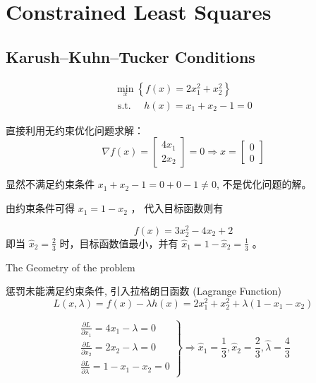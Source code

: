 \chapter{Constrained Least Squares}

\section{Karush–Kuhn–Tucker Conditions}

\begin{problem}
    $$
\begin{array}{l}
\min _{x}\left\{f(x)=2 x_{1}^{2}+x_{2}^{2}\right\} \\
\text { s.t. } \quad h(x)=x_{1}+x_{2}-1=0
\end{array}
$$

直接利用无约束优化问题求解： 
$$ \nabla f(x)=\left[\begin{array}{l}4 x_{1} \\ 2 x_{2}\end{array}\right]=0 \Rightarrow x=\left[\begin{array}{l}0 \\ 0\end{array}\right] $$

显然不满足约束条件 $ x_{1}+x_{2}-1=0+0-1 \neq 0 $, 不是优化问题的解。
\end{problem}

由约束条件可得 $ x_{1}=1-x_{2} $ ， 代入目标函数则有

$$ f(x)=3 x_{2}^{2}-4 x_{2}+2 $$
即当 $ \hat{x}_{2}=\frac{2}{3} $ 时，目标函数值最小，并有 $ \hat{x}_{1}=1-\hat{x}_{2}=\frac{1}{3} $ 。

\begin{FigureCenter}{The Geometry of the problem}
    
\end{FigureCenter}

惩罚未能满足约束条件, 引入拉格朗日函数 (Lagrange Function)
$$
L(x, \lambda)=f(x)-\lambda h(x)=2 x_{1}^{2}+x_{2}^{2}+\lambda\left(1-x_{1}-x_{2}\right)
$$

$$ \left.\begin{array}{l}\frac{\partial L}{\partial x_{1}}=4 x_{1}-\lambda=0 \\ \frac{\partial L}{\partial x_{2}}=2 x_{2}-\lambda=0 \\ \frac{\partial L}{\partial \lambda}=1-x_{1}-x_{2}=0\end{array}\right\} \Rightarrow \hat{x}_{1}=\frac{1}{3}, \hat{x}_{2}=\frac{2}{3}, \hat{\lambda}=\frac{4}{3} $$

